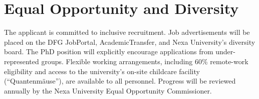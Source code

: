 \section{Equal Opportunity and Diversity}
\label{sec:eod}

The applicant is committed to inclusive recruitment. Job advertisements will be placed
on the DFG JobPortal, AcademicTransfer, and Nexa University's diversity board. The
PhD position will explicitly encourage applications from under-represented groups.
Flexible working arrangements, including 60\% remote-work eligibility and access to the
university's on-site childcare facility (``Quantenmäuse''), are available to all
personnel. Progress will be reviewed annually by the Nexa University Equal Opportunity
Commissioner.

